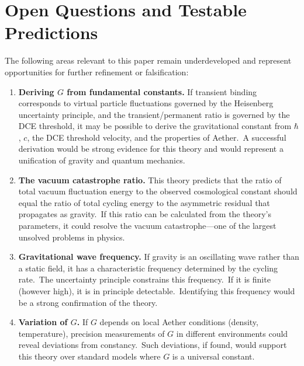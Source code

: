 ﻿\documentclass[12pt,letterpaper]{article}
\begin{document}
\section{Open Questions and Testable Predictions}

The following areas relevant to this paper remain underdeveloped and represent opportunities for further refinement or falsification:

\begin{enumerate}[leftmargin=2em]
  \item \textbf{Deriving $G$ from fundamental constants.} If transient binding corresponds to virtual
    particle fluctuations governed by the Heisenberg uncertainty principle, and the
    transient/permanent ratio is governed by the DCE threshold, it may be possible to
    derive the gravitational constant from $\hbar$, $c$, the DCE threshold velocity, and
    the properties of Aether.\ A successful derivation would be strong evidence for this
    theory and would represent a unification of gravity and quantum mechanics.

  \item \textbf{The vacuum catastrophe ratio.} This theory predicts that the ratio of total vacuum
    fluctuation energy to the observed cosmological constant should equal the ratio of
    total cycling energy to the asymmetric residual that propagates as gravity.\ If this
    ratio can be calculated from the theory's parameters, it could resolve the vacuum
    catastrophe---one of the largest unsolved problems in physics.

  \item \textbf{Gravitational wave frequency.} If gravity is an oscillating wave rather than a static
    field, it has a characteristic frequency determined by the cycling rate.\ The
    uncertainty principle constrains this frequency.\ If it is finite (however high),
    it is in principle detectable.\ Identifying this frequency would be a strong
    confirmation of the theory.

  \item \textbf{Variation of $G$.} If $G$ depends on local Aether conditions (density, temperature),
    precision measurements of $G$ in different environments could reveal deviations from
    constancy.\ Such deviations, if found, would support this theory over standard models
    where $G$ is a universal constant.


\end{enumerate}
\end{document}
